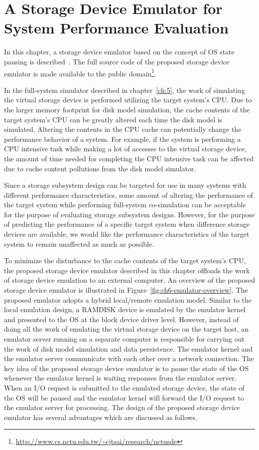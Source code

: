 \chapter{A Storage Device Emulator for System Performance Evaluation}
\label{ch:6}

In this chapter, a storage device emulator based on the concept of OS state pausing is described~\cite{Wu:2015}. The full source code of the proposed storage device emulator is made available to the public domain\footnote{\url{http://www.cs.nctu.edu.tw/~cjtsai/research/nctusde}}. 

In the full-system simulator described in chapter~\ref{ch:5}, the work of simulating the virtual storage device is performed utilizing the target system's CPU. Due to the larger memory footprint for disk model simulation, the cache contents of the target system's CPU can be greatly altered each time the disk model is simulated. Altering the contents in the CPU cache can potentially change the performance behavior of a system. For example, if the system is performing a CPU intensive task while making a lot of accesses to the virtual storage device, the amount of time needed for completing the CPU intensive task can be affected due to cache content pollutions from the disk model simulator.

Since a storage subsystem design can be targeted for use in many systems with different performance characteristics, some amount of altering the performance of the target system while performing full-system co-simulation can be acceptable for the purpose of evaluating storage subsystem designs. However, for the purpose of predicting the performance of a specific target system when difference storage devices are available, we would like the performance characteristics of the target system to remain unaffected as much as possible.

To minimize the disturbance to the cache contents of the target system's CPU, the proposed storage device emulator described in this chapter offloads the work of storage device emulation to an external computer. An overview of the proposed storage device emulator is illustrated in Figure~\ref{fig:ch6-emulator-overview}. The proposed emulator adopts a hybrid local/remote emulation model. Similar to the local emulation design, a RAMDISK device is emulated by the emulator kernel and presented to the OS at the block device driver level. However, instead of doing all the work of emulating the virtual storage device on the target host, an emulator server running on a separate computer is responsible for carrying out the work of disk model simulation and data persistence. The emulator kernel and the emulator server communicate with each other over a network connection. The key idea of the proposed storage device emulator is to pause the state of the OS whenever the emulator kernel is waiting responses from the emulator server. When an I/O request is submitted to the emulated storage device, the state of the OS will be paused and the emulator kernel will forward the I/O request to the emulator server for processing. The design of the proposed storage device emulator has several advantages which are discussed as follows.

